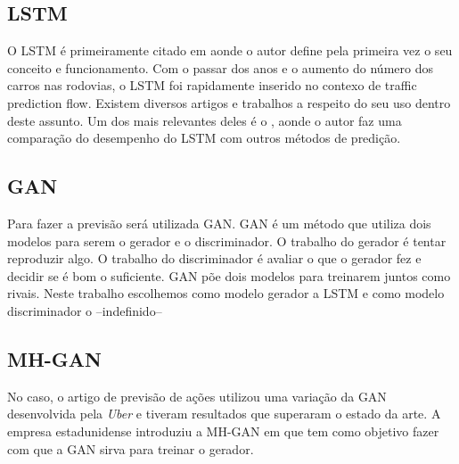 \subsection{LSTM}

O LSTM é primeiramente citado em \cite{Felix_1999} aonde o autor define pela primeira vez o seu conceito e funcionamento. Com o passar dos anos e o aumento do número dos carros nas rodovias, o LSTM foi rapidamente inserido no contexo de traffic prediction flow. Existem diversos artigos e trabalhos a respeito do seu uso dentro deste assunto. Um dos mais relevantes deles é o \cite{Xiaolei_2015}, aonde o autor faz uma comparação do desempenho do LSTM com outros métodos de predição. 






\subsection{GAN}

Para fazer a previsão será utilizada \acrfull{GAN}. \acrshort{GAN} é um método que utiliza dois modelos para serem o gerador e o discriminador. O trabalho do gerador é tentar reproduzir algo. O trabalho do discriminador é avaliar o que o gerador fez e decidir se é bom o suficiente. \acrshort{GAN} põe dois modelos para treinarem juntos como rivais. Neste trabalho escolhemos como modelo gerador a \acrshort{LSTM} e como modelo discriminador o --indefinido--

\subsection{MH-GAN}

No caso, o artigo de previsão de ações utilizou uma variação da \acrshort{GAN} desenvolvida pela \textit{Uber} e tiveram resultados que superaram o estado da arte. A empresa estadunidense introduziu a \acrfull{MH-GAN} em \cite{turner2018metropolis} que tem como objetivo fazer com que a \acrshort{GAN} sirva para treinar o gerador. 